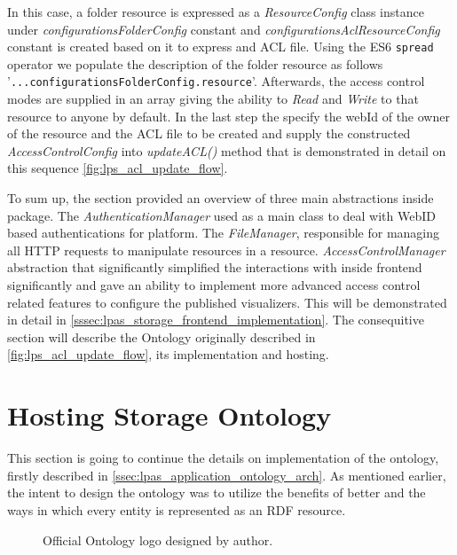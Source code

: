 In this case, a folder resource is expressed as a \textit{ResourceConfig} class instance under \textit{configurationsFolderConfig} constant and \textit{configurationsAclResourceConfig} constant is created based on it to express and ACL file. Using the ES6 \texttt{spread} operator we populate the description of the folder resource as follows '\texttt{...configurationsFolderConfig.resource}'. Afterwards, the access control modes are supplied in an array giving the ability to \textit{Read} and \textit{Write} to that resource to anyone by default. In the last step the specify the webId of the owner of the resource and the ACL file to be created and supply the constructed \textit{AccessControlConfig} into \textit{updateACL()} method that is demonstrated in detail on this sequence \autoref{fig:lps_acl_update_flow}.

To sum up, the section provided an overview of three main abstractions inside \lpas{} package. The \textit{AuthenticationManager} used as a main class to deal with WebID based authentications for \lpa{} platform. The \textit{FileManager}, responsible for managing all HTTP requests to manipulate resources in a \solid{} resource. \textit{AccessControlManager} abstraction that significantly simplified the interactions with \solid{} inside \lpa{} frontend significantly and gave an ability to implement more advanced access control related features to configure the published \lpa{} visualizers. This will be demonstrated in detail in \autoref{sssec:lpas_storage_frontend_implementation}. The consequitive section will describe the \lpas{} Ontology originally described in \autoref{fig:lps_acl_update_flow}, its implementation and hosting.

\section{Hosting Storage Ontology}
\label{ssec:storage_ontology_implementation}

This section is going to continue the details on implementation of the \lpas{} ontology, firstly described in \autoref{ssec:lpas_application_ontology_arch}. As mentioned earlier, the intent to design the ontology was to utilize the benefits of \solid{} better and the ways in which every entity is represented as an RDF resource.

\begin{figure}[h]
\centering
{}
\caption{Official \lpas{} Ontology logo designed by author.}
\label{fig:lpa_ontology_logo}
\end{figure}

